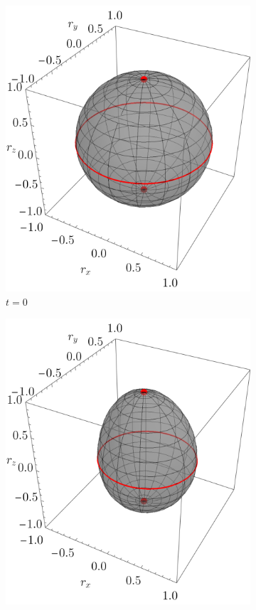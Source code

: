   \begin{figure}[ht!]
    \centering
    \begin{subfigure}{0.32\textwidth}
      \centering
      \includegraphics[width=0.9\linewidth]{chapter4/figures_toy/CNOT_p=0.5_t=0._r=0.9.png}
      \caption{$t=0$}
    \end{subfigure}%
    \begin{subfigure}{0.32\textwidth}
      \centering
      \includegraphics[width=0.9\linewidth]{chapter4/figures_toy/CNOT_p=0.9_t=0.5_r=0.9.png}

\end{subfigure}
\end{figure}
